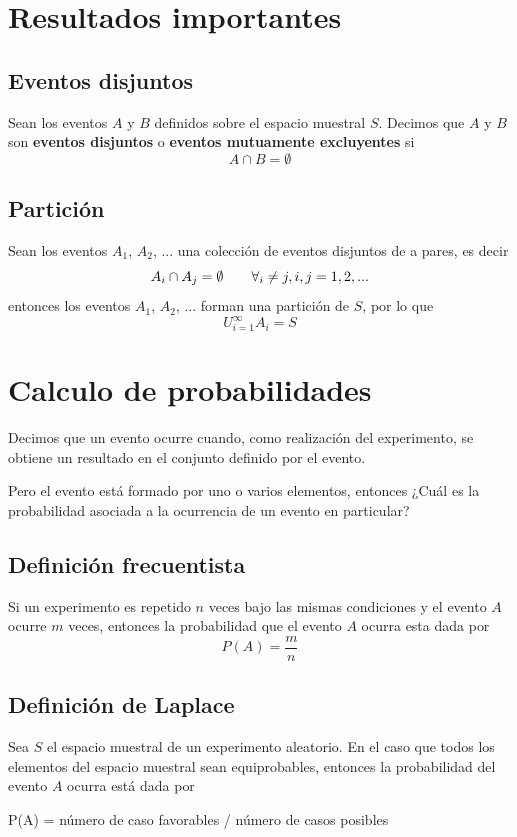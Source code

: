 \documentclass[12pt,twocolumn,a4paper]{report}
\begin{document}
\section*{Resultados importantes}

\subsection*{Eventos disjuntos}
Sean los eventos $A$ y $B$ definidos sobre el espacio muestral $S$. Decimos que $A$ y $B$ son \textbf{eventos disjuntos} o \textbf{eventos mutuamente excluyentes} si
$$
A \cap B = \emptyset
$$

\subsection*{Partición}
Sean los eventos $A_1$, $A_2$, ... una colección de eventos disjuntos de a pares, es decir
$$
A_i \cap A_j = \emptyset \hspace{20 px} \forall_i \not= j,i, j=1,2,...
$$
entonces los eventos $A_1$, $A_2$, ... forman una partición de $S$, por lo que
$$
U_{i=1}^{\infty}A_i = S
$$

\section*{Calculo de probabilidades}
Decimos que un evento ocurre cuando, como realización del experimento, se obtiene un resultado en el conjunto definido por el evento. 

Pero el evento está formado por uno o varios elementos, entonces ¿Cuál es la probabilidad asociada a la ocurrencia de un evento en particular? 

\subsection*{Definición frecuentista}
Si un experimento es repetido $n$ veces bajo las mismas condiciones y el evento $A$ ocurre $m$ veces, entonces la probabilidad que el evento $A$ ocurra esta dada por
$$
P(A) = \dfrac{m}{n}
$$
\subsection*{Definición de Laplace}
Sea $S$ el espacio muestral de un experimento aleatorio. En el caso que todos los elementos del espacio muestral sean equiprobables, entonces la probabilidad del evento $A$ ocurra está dada por 
\begin{center}
P(A) = número de caso favorables / número de casos posibles
\end{center}
\end{document}
